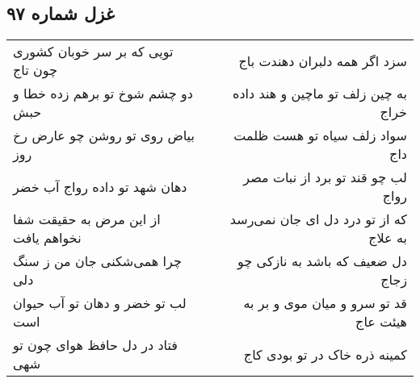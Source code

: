 \begin{center}
\section*{غزل شماره ۹۷}
\label{sec:sh097}
\begin{longtable}{l p{0.5cm} r}
تویی که بر سر خوبان کشوری چون تاج
&&
سزد اگر همه دلبران دهندت باج
\\
دو چشم شوخ تو برهم زده خطا و حبش
&&
به چین زلف تو ماچین و هند داده خراج
\\
بیاض روی تو روشن چو عارض رخ روز
&&
سواد زلف سیاه تو هست ظلمت داج
\\
دهان شهد تو داده رواج آب خضر
&&
لب چو قند تو برد از نبات مصر رواج
\\
از این مرض به حقیقت شفا نخواهم یافت
&&
که از تو درد دل ای جان نمی‌رسد به علاج
\\
چرا همی‌شکنی جان من ز سنگ دلی
&&
دل ضعیف که باشد به نازکی چو زجاج
\\
لب تو خضر و دهان تو آب حیوان است
&&
قد تو سرو و میان موی و بر به هیئت عاج
\\
فتاد در دل حافظ هوای چون تو شهی
&&
کمینه ذره خاک در تو بودی کاج
\\
\end{longtable}
\end{center}
